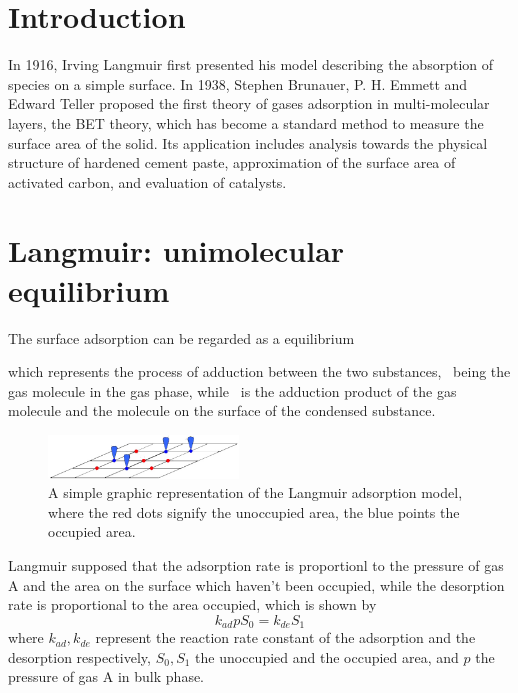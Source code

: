 \documentclass[%
 reprint,
 amsmath,amssymb,
 aps,
10.5pt,
]{revtex4-1}
\begin{document}
\tableofcontents

\section{Introduction}

In 1916, Irving Langmuir first presented his model describing the absorption of species on a simple surface\cite{langmuir1918adsorption}. In 1938, Stephen Brunauer, P. H. Emmett and Edward Teller proposed the first theory of gases adsorption in multi-molecular layers, the BET theory, which has become a standard method to measure the surface area of the solid\cite{brunauer1938adsorption}. Its application includes analysis towards the physical structure of hardened cement paste, approximation of the surface area of activated carbon, and evaluation of catalysts.

\section{Langmuir: unimolecular equilibrium}
The surface adsorption can be regarded as a equilibrium
\begin{center}
\end{center}
which represents the process of adduction between the two substances, ~being the gas molecule in the gas phase, while ~is the adduction product of the gas molecule and the molecule on the surface of the condensed substance.

\begin{figure}
\centering
\includegraphics[width=0.45\textwidth]{figures/Langmuir_Adsorption_Model.jpg}
\caption{A simple graphic representation of the Langmuir adsorption model, where the red dots signify the unoccupied area, the blue points the occupied area.}
\end{figure}

Langmuir supposed that the adsorption rate is proportionl to the pressure of gas A and the area on the surface which haven't been occupied, while the desorption rate is proportional to the area occupied, which is shown by
\begin{equation}
k_{ad} p S_0 = k_{de} S_1
\end{equation}
where $k_{ad},k_{de}$ represent the reaction rate constant of the adsorption and the desorption respectively, $S_0,S_1$ the unoccupied and the occupied area, and $p$ the pressure of gas A in bulk phase.
\end{document}
